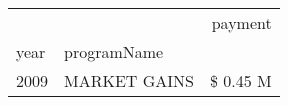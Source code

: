 \begin{tabular}{llr}
\toprule
 &  & payment \\
year & programName &  \\
\midrule
2009 & MARKET GAINS & \$ 0.45 M \\
\cline{1-3}
\bottomrule
\end{tabular}
